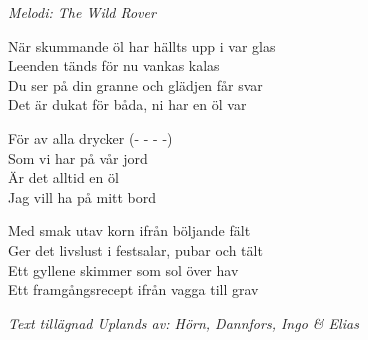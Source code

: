 {\footnotesize\textit{Melodi: The Wild Rover}}\par
\vspace{10pt}
När skummande öl har hällts upp i var glas\\
Leenden tänds för nu vankas kalas\\
Du ser på din granne och glädjen får svar\\
Det är dukat för båda, ni har en öl var\par
\vspace{10pt}
\revrpt För av alla drycker (- - - -)\\
Som vi har på vår jord\\
Är det alltid en öl\\
Jag vill ha på mitt bord\rpt\par
\vspace{10pt}
Med smak utav korn ifrån böljande fält\\
Ger det livslust i festsalar, pubar och tält\\
Ett gyllene skimmer som sol över hav\\
Ett framgångsrecept ifrån vagga till grav\par
\vspace{10pt}
{\footnotesize\textit{Text tillägnad Uplands av: Hörn, Dannfors, Ingo \& Elias}}
